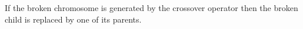 If the broken chromosome is generated by the crossover operator then the broken child is replaced by one of its parents.

%
%
%
